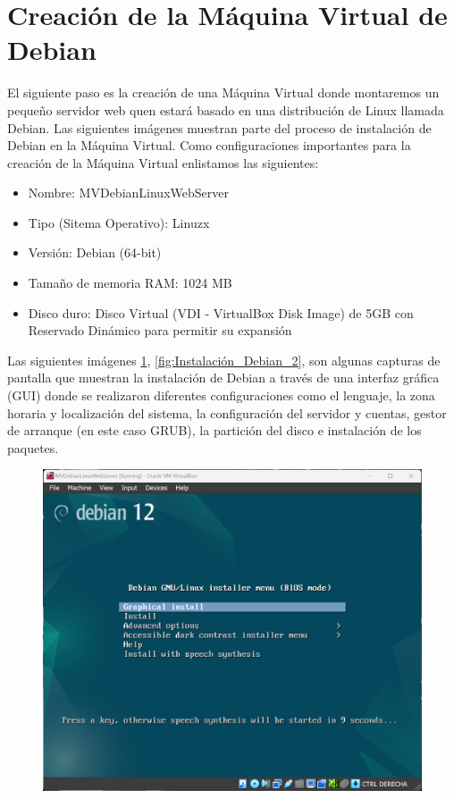 \documentclass[12pt,a4paper]{article}
\begin{document}
\section{Creación de la Máquina Virtual de Debian}

El siguiente paso es la creación de una Máquina Virtual donde montaremos un pequeño servidor web quen estará basado en una distribución de Linux llamada Debian. Las siguientes imágenes muestran parte del proceso de instalación de Debian en la Máquina Virtual. Como configuraciones importantes para la creación de la Máquina Virtual enlistamos las siguientes:

\begin{itemize}
    \item Nombre: MVDebianLinuxWebServer
    \item Tipo (Sitema Operativo): Linuzx
    \item Versión: Debian (64-bit)
    \item Tamaño de memoria RAM: 1024 MB
    \item Disco duro: Disco Virtual (VDI - VirtualBox Disk Image) de 5GB con Reservado Dinámico para permitir su expansión
\end{itemize}

Las siguientes imágenes \ref{fig:Instalación_Debian_1}, \ref{fig:Instalación_Debian_2}, son algunas capturas de pantalla que muestran la instalación de Debian a través de una interfaz gráfica (GUI) donde se realizaron diferentes configuraciones como el lenguaje, la zona horaria y localización del sistema, la configuración del servidor y cuentas, gestor de arranque (en este caso GRUB), la partición del disco e instalación de los paquetes.

\begin{figure}[H]
    \centering
    \includegraphics[width=1\linewidth]{M3_Virtualización_y_Contenedores/Tarea_2_Máquina_Virtual_Local/reporte/figuras/3-1_Máquina_Virtual_de_Debian.png}
    \label{fig:Instalación_Debian_1}
\end{figure}
\end{document}
